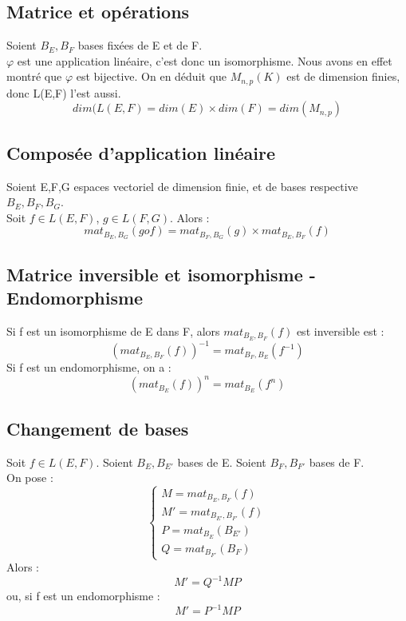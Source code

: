 \subsection{Matrice et opérations}
\begin{de}
 Soient $B_E,B_F$ bases fixées de E et de F. \\
$\varphi$ est une application linéaire, c'est donc un isomorphisme. Nous avons en effet montré que $\varphi$ est bijective. On en déduit que $M_{n,p}(K)$ est de dimension finies, donc L(E,F) l'est aussi.
$$dim(L(E,F)=dim(E)\times dim(F)=dim(M_{n,p})$$
\end{de}
\subsection{Composée d'application linéaire}
\begin{de}
Soient E,F,G espaces vectoriel de dimension finie, et de bases respective $B_E,B_F,B_G$.\\
Soit $f \in L(E,F)$, $g \in L(F,G)$. Alors : 
$$mat_{B_E,B_G}(gof)=mat_{B_F,B_G}(g)\times mat_{B_E,B_F}(f)$$
\end{de}
\subsection{Matrice inversible et isomorphisme - Endomorphisme}
\begin{de}
Si f est un isomorphisme de E dans F, alors $mat_{B_E,B_F}(f)$ est inversible est : 
$$(mat_{B_E,B_F}(f))^{-1}=mat_{B_F,B_E}(f^{-1})$$
Si f est un endomorphisme, on a : 
$$(mat_{B_E}(f))^n = mat_{B_E}(f^n)$$
\end{de}
\subsection{Changement de bases}
\begin{de}
Soit $f \in L(E,F)$. Soient $B_E,B_{E'}$ bases de E. Soient $B_F,B_{F'}$ bases de F. \\
On pose : \[\left\{
  \begin{array}{ll}
    M = mat_{B_E,B_F}(f)\\
    M' = mat_{B_{E'},B_{F'}}(f) \\
    P = mat_{B_E}(B_{E'}) \\
    Q = mat_{B_{F'}}(B_{F})
  \end{array}\right.\]
Alors : 
$$M' = Q^{-1}MP$$
ou, si f est un endomorphisme :
$$M' = P^{-1}MP$$
\end{de}
